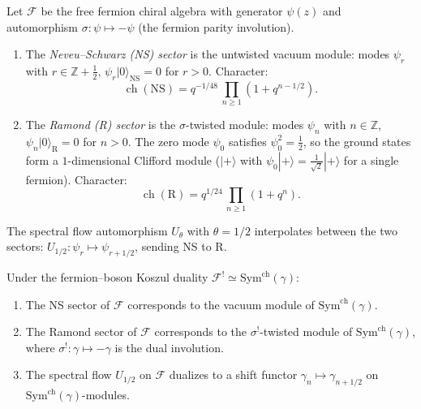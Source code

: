 \begin{definition}\label{def:ramond-ns}
Let $\mathcal{F}$ be the free fermion chiral algebra with generator
$\psi(z)$ and automorphism $\sigma: \psi \mapsto -\psi$ (the fermion
parity involution).
\begin{enumerate}[label=\textup{(\roman*)}]
\item The \emph{Neveu--Schwarz (NS) sector} is the untwisted vacuum
 module: modes $\psi_{r}$ with $r \in \mathbb{Z} + \tfrac{1}{2}$,
 $\psi_r|0\rangle_{\mathrm{NS}} = 0$ for $r > 0$. Character:
 \[
 \operatorname{ch}(\mathrm{NS})
 = q^{-1/48}\,\prod_{n \geq 1}(1 + q^{n-1/2}).
 \]
\item The \emph{Ramond (R) sector} is the $\sigma$-twisted module:
 modes $\psi_n$ with $n \in \mathbb{Z}$, $\psi_n|0\rangle_{\mathrm{R}} = 0$
 for $n > 0$. The zero mode $\psi_0$ satisfies $\psi_0^2 = \tfrac{1}{2}$,
 so the ground states form a $1$-dimensional Clifford module
 ($|+\rangle$ with $\psi_0|+\rangle = \tfrac{1}{\sqrt{2}}|+\rangle$
 for a single fermion).
 Character:
 \[
 \operatorname{ch}(\mathrm{R})
 = q^{1/24}\,\prod_{n \geq 1}(1 + q^n).
 \]
\end{enumerate}
The spectral flow automorphism $U_\theta$ with $\theta = 1/2$
interpolates between the two sectors:
$U_{1/2}: \psi_r \mapsto \psi_{r+1/2}$, sending NS to R.
\end{definition}

\begin{proposition}
\label{prop:twisted-fermion-kd}
Under the fermion--boson Koszul duality
$\mathcal{F}^! \simeq \mathrm{Sym}^{\mathrm{ch}}(\gamma)$:
\begin{enumerate}[label=\textup{(\roman*)}]
\item The NS sector of $\mathcal{F}$ corresponds to the vacuum module
 of $\mathrm{Sym}^{\mathrm{ch}}(\gamma)$.
\item The Ramond sector of $\mathcal{F}$ corresponds to the
 $\sigma^!$-twisted module of $\mathrm{Sym}^{\mathrm{ch}}(\gamma)$,
 where $\sigma^!: \gamma \mapsto -\gamma$ is the dual involution.
\item The spectral flow $U_{1/2}$ on $\mathcal{F}$ dualizes to a
 shift functor $\gamma_n \mapsto \gamma_{n+1/2}$ on
 $\mathrm{Sym}^{\mathrm{ch}}(\gamma)$-modules.
\end{enumerate}
\end{proposition}

